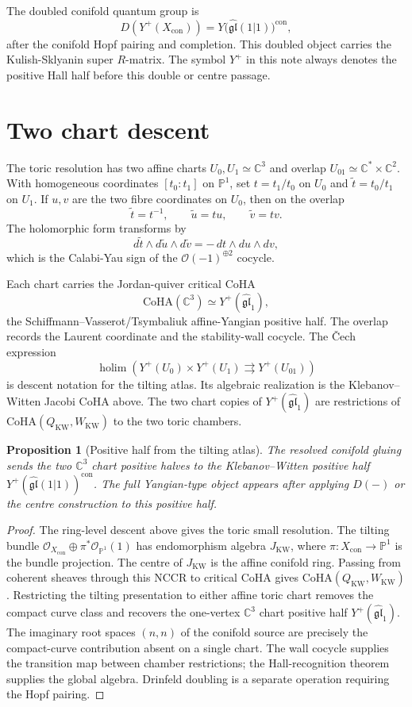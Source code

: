 \documentclass[11pt]{amsart}
\providecommand{\C}{\mathbb{C}}
\providecommand{\bP}{\mathbb{P}}
\providecommand{\cO}{\mathcal{O}}
\providecommand{\fgl}{\mathfrak{gl}}
\providecommand{\CoHA}{\mathrm{CoHA}}
\providecommand{\holim}{\operatorname{holim}}
\theoremstyle{plain}
\newtheorem{proposition}[theorem]{Proposition}
\theoremstyle{definition}
\theoremstyle{remark}
\begin{document}
The doubled conifold quantum group is
\[
  D\!\left(Y^+(X_{\mathrm{con}})\right)
  =
  Y\!\bigl(\widehat{\fgl}(1|1)\bigr)^{\mathrm{con}},
\]
after the conifold Hopf pairing and completion.  This doubled object
carries the Kulish-Sklyanin super $R$-matrix.  The symbol $Y^+$ in this
note always denotes the positive Hall half before this double or centre
passage.

\section{Two chart descent}

The toric resolution has two affine charts $U_0,U_1\simeq\C^3$ and
overlap $U_{01}\simeq\C^*\times\C^2$.  With homogeneous coordinates
$[t_0:t_1]$ on $\bP^1$, set $t=t_1/t_0$ on $U_0$ and
$\tilde t=t_0/t_1$ on $U_1$.  If $u,v$ are the two fibre coordinates on
$U_0$, then on the overlap
\[
  \tilde t=t^{-1},\qquad \tilde u=tu,\qquad \tilde v=tv.
\]
The holomorphic form transforms by
\[
  d\tilde t\wedge d\tilde u\wedge d\tilde v
  =
  -\,dt\wedge du\wedge dv,
\]
which is the Calabi-Yau sign of the $\cO(-1)^{\oplus2}$ cocycle.

Each chart carries the Jordan-quiver critical CoHA
\[
  \CoHA(\C^3)\simeq Y^+(\widehat{\fgl}_1),
\]
the Schiffmann--Vasserot/Tsymbaliuk affine-Yangian positive half.  The
overlap records the Laurent coordinate and the stability-wall cocycle.
The \v{C}ech expression
\[
  \holim\!\left(
  Y^+(U_0)\times Y^+(U_1)\rightrightarrows Y^+(U_{01})
  \right)
\]
is descent notation for the tilting atlas.  Its algebraic realization
is the Klebanov--Witten Jacobi CoHA above.  The two chart copies of
$Y^+(\widehat{\fgl}_1)$ are restrictions of
$\CoHA(Q_{\mathrm{KW}},W_{\mathrm{KW}})$ to the two toric chambers.

\begin{proposition}[Positive half from the tilting atlas]
The resolved conifold gluing sends the two $\C^3$ chart positive halves
to the Klebanov--Witten positive half
$Y^+(\widehat{\fgl}(1|1))^{\mathrm{con}}$.  The full Yangian-type
object appears after applying $D(-)$ or the centre construction to this
positive half.
\end{proposition}

\begin{proof}
The ring-level descent above gives the toric small resolution.  The
tilting bundle
$\cO_{X_{\mathrm{con}}}\oplus\pi^*\cO_{\bP^1}(1)$ has endomorphism
algebra $J_{\mathrm{KW}}$, where
$\pi\colon X_{\mathrm{con}}\to\bP^1$ is the bundle projection.  The
centre of $J_{\mathrm{KW}}$ is the affine conifold ring.  Passing from
coherent sheaves through this NCCR to critical CoHA gives
$\CoHA(Q_{\mathrm{KW}},W_{\mathrm{KW}})$.  Restricting the tilting
presentation to either affine toric chart removes the compact curve
class and recovers the one-vertex $\C^3$ chart positive half
$Y^+(\widehat{\fgl}_1)$.  The imaginary root spaces
$(n,n)$ of the conifold source are precisely the compact-curve
contribution absent on a single chart.  The wall cocycle supplies the
transition map between chamber restrictions; the Hall-recognition
theorem supplies the global algebra.  Drinfeld doubling is a separate
operation requiring the Hopf pairing.
\end{proof}
\end{document}
